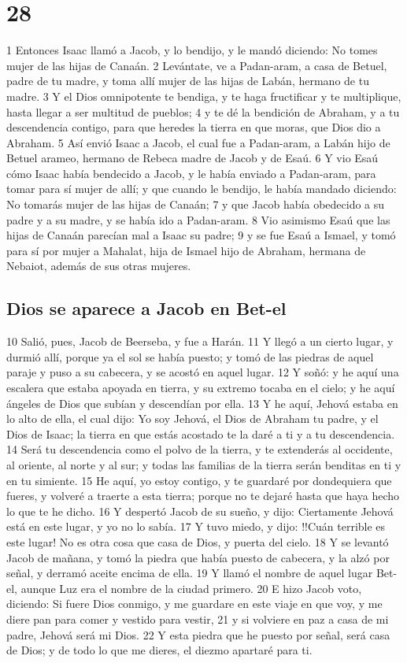 \chapter{28}

1 Entonces Isaac llamó a Jacob, y lo bendijo, y le mandó diciendo: No tomes mujer de las hijas de Canaán.
2 Levántate, ve a Padan-aram, a casa de Betuel, padre de tu madre, y toma allí mujer de las hijas de Labán, hermano de tu madre.
3 Y el Dios omnipotente te bendiga, y te haga fructificar y te multiplique, hasta llegar a ser multitud de pueblos;
4 y te dé la bendición de Abraham, y a tu descendencia contigo, para que heredes la tierra en que moras, que Dios dio a Abraham.
5 Así envió Isaac a Jacob, el cual fue a Padan-aram, a Labán hijo de Betuel arameo, hermano de Rebeca madre de Jacob y de Esaú.
6 Y vio Esaú cómo Isaac había bendecido a Jacob, y le había enviado a Padan-aram, para tomar para sí mujer de allí; y que cuando le bendijo, le había mandado diciendo: No tomarás mujer de las hijas de Canaán;
7 y que Jacob había obedecido a su padre y a su madre, y se había ido a Padan-aram.
8 Vio asimismo Esaú que las hijas de Canaán parecían mal a Isaac su padre;
9 y se fue Esaú a Ismael, y tomó para sí por mujer a Mahalat, hija de Ismael hijo de Abraham, hermana de Nebaiot, además de sus otras mujeres.

\section*{Dios se aparece a Jacob en Bet-el}

10 Salió, pues, Jacob de Beerseba, y fue a Harán.
11 Y llegó a un cierto lugar, y durmió allí, porque ya el sol se había puesto; y tomó de las piedras de aquel paraje y puso a su cabecera, y se acostó en aquel lugar.
12 Y soñó: y he aquí una escalera que estaba apoyada en tierra, y su extremo tocaba en el cielo; y he aquí ángeles de Dios que subían y descendían por ella.
13 Y he aquí, Jehová estaba en lo alto de ella, el cual dijo: Yo soy Jehová, el Dios de Abraham tu padre, y el Dios de Isaac; la tierra en que estás acostado te la daré a ti y a tu descendencia.
14 Será tu descendencia como el polvo de la tierra, y te extenderás al occidente, al oriente, al norte y al sur; y todas las familias de la tierra serán benditas en ti y en tu simiente.
15 He aquí, yo estoy contigo, y te guardaré por dondequiera que fueres, y volveré a traerte a esta tierra; porque no te dejaré hasta que haya hecho lo que te he dicho.
16 Y despertó Jacob de su sueño, y dijo: Ciertamente Jehová está en este lugar, y yo no lo sabía.
17 Y tuvo miedo, y dijo: !!Cuán terrible es este lugar! No es otra cosa que casa de Dios, y puerta del cielo.
18 Y se levantó Jacob de mañana, y tomó la piedra que había puesto de cabecera, y la alzó por señal, y derramó aceite encima de ella.
19 Y llamó el nombre de aquel lugar Bet-el, aunque Luz era el nombre de la ciudad primero.
20 E hizo Jacob voto, diciendo: Si fuere Dios conmigo, y me guardare en este viaje en que voy, y me diere pan para comer y vestido para vestir,
21 y si volviere en paz a casa de mi padre, Jehová será mi Dios.
22 Y esta piedra que he puesto por señal, será casa de Dios; y de todo lo que me dieres, el diezmo apartaré para ti.


